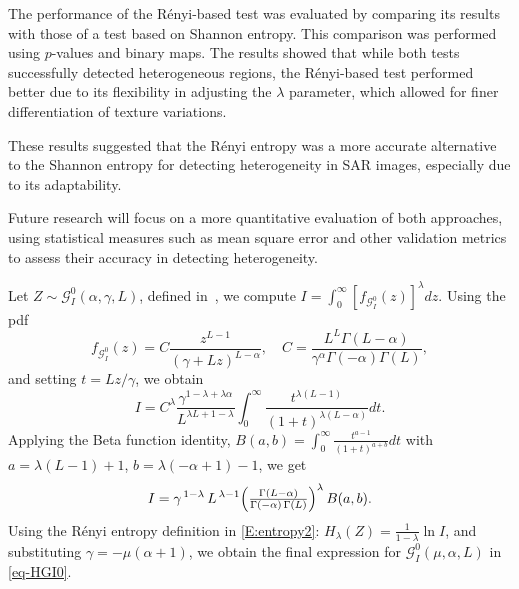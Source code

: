 \documentclass[
  journal,
]{IEEEtran}%
\begin{document}
The performance of the Rényi-based test was evaluated by comparing its
results with those of a test based on Shannon entropy. This comparison
was performed using \(p\)-values and binary maps. The results showed
that while both tests successfully detected heterogeneous regions, the
Rényi-based test performed better due to its flexibility in adjusting
the \(\lambda\) parameter, which allowed for finer differentiation of
texture variations.

These results suggested that the Rényi entropy was a more accurate
alternative to the Shannon entropy for detecting heterogeneity in SAR
images, especially due to its adaptability.

Future research will focus on a more quantitative evaluation of both
approaches, using statistical measures such as mean square error and
other validation metrics to assess their accuracy in detecting
heterogeneity.


Let \(Z \sim \mathcal{G}^0_I(\alpha, \gamma, L)\), defined
in~, we compute
\(I = \int_0^\infty [f_{\mathcal{G}^0_I}(z)]^\lambda dz\). Using the
pdf\\
\begin{equation*}
f_{\mathcal{G}^0_I}(z) = C \frac{z^{L-1}}{(\gamma + Lz)^{L-\alpha}},  
\quad C = \frac{L^L \Gamma(L - \alpha)}{\gamma^\alpha \Gamma(-\alpha) \Gamma(L)}, \label{eq:pdf_G0I}
\end{equation*} and setting \(t = Lz/\gamma\), we obtain\\
\begin{equation*}
I = C^\lambda \frac{\gamma^{1-\lambda+\lambda\alpha}}{L^{\lambda L + 1 - \lambda}}  
\int_0^\infty \frac{t^{\lambda(L-1)}}{(1+t)^{\lambda(L-\alpha)}} dt.
\end{equation*} Applying the Beta function identity,
\(B(a,b) = \int_0^\infty \frac{t^{a-1}}{(1+t)^{a+b}} dt\) with
\(a = \lambda(L-1) + 1\), \(b = \lambda(-\alpha+1) - 1\), we get\\
\begin{equation*}
I= \gamma^{\,1 - \lambda}\,
   L^{\,\lambda - 1}
   \Bigl(\tfrac{\Gamma(L - \alpha)}{\Gamma(-\alpha)\,\Gamma(L)}\Bigr)^\lambda
   \,B(a,b).
\end{equation*} Using the Rényi entropy definition in
\eqref{E:entropy2}: \(H_\lambda(Z) = \frac{1}{1-\lambda} \ln I\), and
substituting \(\gamma = -\mu(\alpha + 1)\), we obtain the final
expression for \(\mathcal{G}^0_I(\mu, \alpha, L)\) in \eqref{eq-HGI0}.
\end{document}
